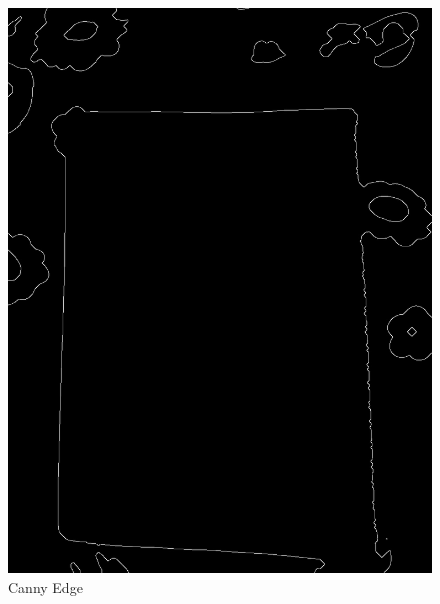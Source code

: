 \begin{enumerate}
\begin{figure}[h]
\begin{minipage}[b]{0.30\linewidth}
            \includegraphics[width=\linewidth]{output/edges.jpg}
            \caption{Canny Edge}
        \end{minipage}
        

\end{figure}
\end{enumerate}
